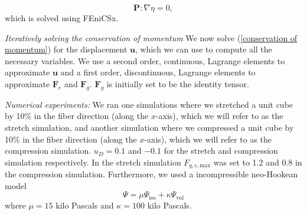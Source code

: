 \begin{equation}
\label{conservation of momentum}
    \mathbf{P} : \nabla\eta = 0,
\end{equation}
which is solved using FEniCSx.
\par
\emph{Iteratively solving the conservation of momentum}
We now solve (\ref{conservation of momentum}) for the displacement $\mathbf{u}$, which we can use to compute all the necessary variables. We use a second order, continuous, Lagrange elements to approximate $\mathbf{u}$ and a first order, discontinuous, Lagrange elements to approximate $\mathbf{F}_e$ and $\mathbf{F}_g$. $\mathbf{F}_g$ is initially set to be the identity tensor. \par
\emph{Numerical experiments:} We ran one simulations where we stretched a unit cube by 10\% in the fiber direction (along the $x$-axis), which we will refer to as the stretch simulation, and another simulation where we compressed a unit cube by 10\% in the fiber direction (along the $x$-axis), which we will refer to as the compression simulation. $u_D = 0.1$ and $-0.1$ for the stretch and compression simulation respectively. In the stretch simulation $F_{g,c,\mathrm{max}}$ was set to 1.2 and 0.8 in the compression simulation. Furthermore, we used a  incompressible neo-Hookean model
\begin{equation*}
    \Psi = \mu\Psi_\text{iso} + \kappa\Psi_\text{vol}
\end{equation*}
where $\mu = 15$ kilo Pascals and $\kappa = 100$ kilo Pascals.
